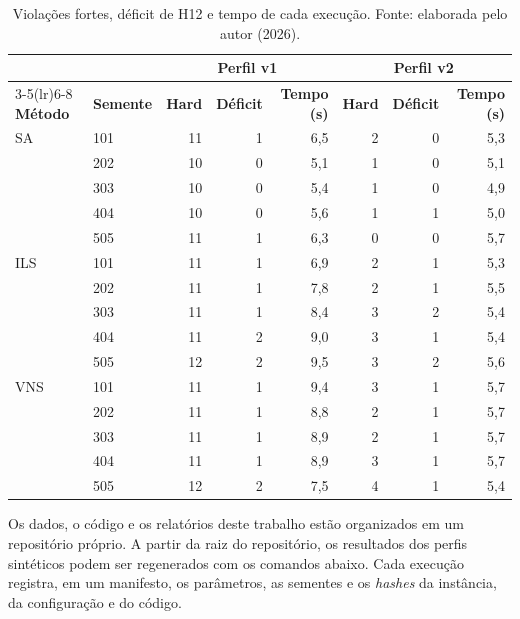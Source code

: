 \begin{table}[htbp]
  \centering
  \caption{Violações fortes, déficit de H12 e tempo de cada execução. Fonte: elaborada pelo autor (2026).}
  \label{tab:apendice_sementes}
  \small
  \begin{tabular}{llrrrrrr}
    \toprule
    & & \multicolumn{3}{c}{\textbf{Perfil v1}} & \multicolumn{3}{c}{\textbf{Perfil v2}} \\
    \cmidrule(lr){3-5}\cmidrule(lr){6-8}
    \textbf{Método} & \textbf{Semente} & \textbf{Hard} & \textbf{Déficit} & \textbf{Tempo (s)} & \textbf{Hard} & \textbf{Déficit} & \textbf{Tempo (s)} \\
    \midrule
    SA & 101 & 11 & 1 & 6,5 & 2 & 0 & 5,3 \\
     & 202 & 10 & 0 & 5,1 & 1 & 0 & 5,1 \\
     & 303 & 10 & 0 & 5,4 & 1 & 0 & 4,9 \\
     & 404 & 10 & 0 & 5,6 & 1 & 1 & 5,0 \\
     & 505 & 11 & 1 & 6,3 & 0 & 0 & 5,7 \\
    \midrule
    ILS & 101 & 11 & 1 & 6,9 & 2 & 1 & 5,3 \\
     & 202 & 11 & 1 & 7,8 & 2 & 1 & 5,5 \\
     & 303 & 11 & 1 & 8,4 & 3 & 2 & 5,4 \\
     & 404 & 11 & 2 & 9,0 & 3 & 1 & 5,4 \\
     & 505 & 12 & 2 & 9,5 & 3 & 2 & 5,6 \\
    \midrule
    VNS & 101 & 11 & 1 & 9,4 & 3 & 1 & 5,7 \\
     & 202 & 11 & 1 & 8,8 & 2 & 1 & 5,7 \\
     & 303 & 11 & 1 & 8,9 & 2 & 1 & 5,7 \\
     & 404 & 11 & 1 & 8,9 & 3 & 1 & 5,7 \\
     & 505 & 12 & 2 & 7,5 & 4 & 1 & 5,4 \\
    \bottomrule
  \end{tabular}
\end{table}


Os dados, o código e os relatórios deste trabalho estão organizados em um repositório próprio.  A partir da raiz do repositório, os resultados dos perfis sintéticos podem ser regenerados com os comandos abaixo. Cada execução registra, em um manifesto, os parâmetros, as sementes e os \textit{hashes} da instância, da configuração e do código.


